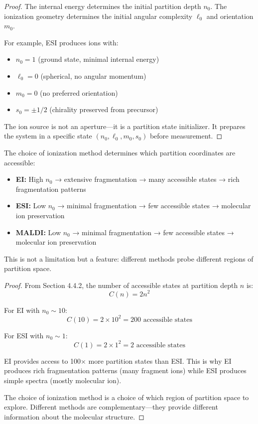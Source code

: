 \begin{proof}
The internal energy determines the initial partition depth $n_0$. The ionization geometry determines the initial angular complexity $\ell_0$ and orientation $m_0$.

For example, ESI produces ions with:
\begin{itemize}
    \item $n_0 = 1$ (ground state, minimal internal energy)
    \item $\ell_0 = 0$ (spherical, no angular momentum)
    \item $m_0 = 0$ (no preferred orientation)
    \item $s_0 = \pm 1/2$ (chirality preserved from precursor)
\end{itemize}

The ion source is not an aperture—it is a partition state initializer. It prepares the system in a specific state $(n_0, \ell_0, m_0, s_0)$ before measurement.
\end{proof}

\begin{corollary}
\label{cor:ionization_coordinates}
The choice of ionization method determines which partition coordinates are accessible:
\begin{itemize}
    \item \textbf{EI:} High $n_0$ → extensive fragmentation → many accessible states → rich fragmentation patterns
    \item \textbf{ESI:} Low $n_0$ → minimal fragmentation → few accessible states → molecular ion preservation
    \item \textbf{MALDI:} Low $n_0$ → minimal fragmentation → few accessible states → molecular ion preservation
\end{itemize}

This is not a limitation but a feature: different methods probe different regions of partition space.
\end{corollary}

\begin{proof}
From Section 4.4.2, the number of accessible states at partition depth $n$ is:
\begin{equation}
C(n) = 2n^2
\end{equation}

For EI with $n_0 \sim 10$:
\begin{equation}
C(10) = 2 \times 10^2 = 200 \text{ accessible states}
\end{equation}

For ESI with $n_0 \sim 1$:
\begin{equation}
C(1) = 2 \times 1^2 = 2 \text{ accessible states}
\end{equation}

EI provides access to 100× more partition states than ESI. This is why EI produces rich fragmentation patterns (many fragment ions) while ESI produces simple spectra (mostly molecular ion).

The choice of ionization method is a choice of which region of partition space to explore. Different methods are complementary—they provide different information about the molecular structure.
\end{proof}

